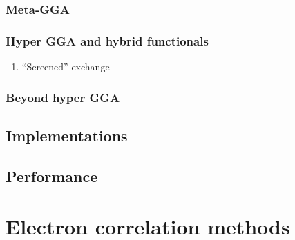 \documentclass[11pt]{article}
\begin{document}
\subsubsection{Meta-GGA}
\label{sec-14-6-3}

\subsubsection{Hyper GGA and hybrid functionals}
\label{sec-14-6-4}

\begin{enumerate}
\item ``Screened'' exchange
\label{sec-14-6-4-1}
\end{enumerate}

\subsubsection{Beyond hyper GGA}
\label{sec-14-6-5}

\subsection{Implementations}
\label{sec-14-7}

\subsection{Performance}
\label{sec-14-8}
\newpage
\newpage
\section{Electron correlation methods}
\label{sec-15}
\newpage
\end{document}
